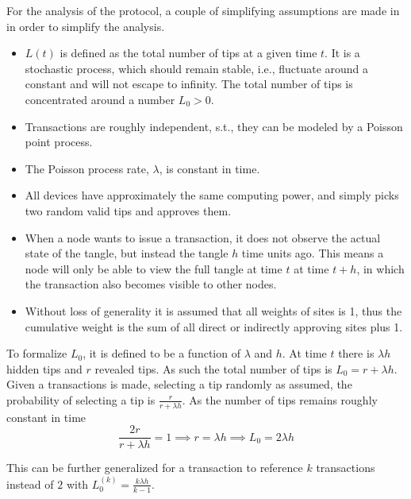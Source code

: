 For the analysis of the protocol, a couple of simplifying assumptions are made in \cite{tangle} in order to simplify the analysis.
\begin{itemize}
    \item $L(t)$ is defined as the total number of tips at a given time $t$. It is a stochastic process, which should remain stable, i.e., fluctuate around a constant and will not escape to infinity. The total number of tips is concentrated around a number $L_0 > 0$.
    \item Transactions are roughly independent, s.t., they can be modeled by a Poisson point process.
    \item The Poisson process rate, $\lambda$, is constant in time.
    \item All devices have approximately the same computing power, and simply picks two random valid tips and approves them.
    \item When a node wants to issue a transaction, it does not observe the actual state of the tangle, but instead the tangle $h$ time units ago. This means a node will only be able to view the full tangle at time $t$ at time $t+h$, in which the transaction also becomes visible to other nodes.
    \item Without loss of generality it is assumed that all weights of sites is 1, thus the cumulative weight is the sum of all direct or indirectly approving sites plus 1.
\end{itemize}

To formalize $L_0$, it is defined to be a function of $\lambda$ and $h$. At time $t$ there is $\lambda h$ hidden tips and $r$ revealed tips. As such the total number of tips is $L_0 = r + \lambda h$. Given a transactions is made, selecting a tip randomly as assumed, the probability of selecting a tip is $\frac{r}{r+\lambda h}$. As the number of tips remains roughly constant in time
\begin{equation*}
    \frac{2r}{r+\lambda h} = 1 \implies r = \lambda h \implies L_0 = 2\lambda h
\end{equation*}

This can be further generalized for a transaction to reference $k$ transactions instead of $2$ with $L_0^{(k)} = \frac{k \lambda h}{k-1}$.

